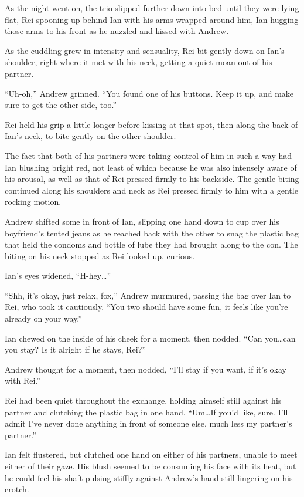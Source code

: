 As the night went on, the trio slipped further down into bed until they were lying flat, Rei spooning up behind Ian with his arms wrapped around him, Ian hugging those arms to his front as he nuzzled and kissed with Andrew.

As the cuddling grew in intensity and sensuality, Rei bit gently down on Ian's shoulder, right where it met with his neck, getting a quiet moan out of his partner.

``Uh-oh,'' Andrew grinned. ``You found one of his buttons. Keep it up, and make sure to get the other side, too.''

Rei held his grip a little longer before kissing at that spot, then along the back of Ian's neck, to bite gently on the other shoulder.

The fact that both of his partners were taking control of him in such a way had Ian blushing bright red, not least of which because he was also intensely aware of his arousal, as well as that of Rei pressed firmly to his backside. The gentle biting continued along his shoulders and neck as Rei pressed firmly to him with a gentle rocking motion.

Andrew shifted some in front of Ian, slipping one hand down to cup over his boyfriend's tented jeans as he reached back with the other to snag the plastic bag that held the condoms and bottle of lube they had brought along to the con. The biting on his neck stopped as Rei looked up, curious.

Ian's eyes widened, ``H-hey\ldots{}''

``Shh, it's okay, just relax, fox,'' Andrew murmured, passing the bag over Ian to Rei, who took it cautiously. ``You two should have some fun, it feels like you're already on your way.''

Ian chewed on the inside of his cheek for a moment, then nodded. ``Can you\ldots{}can you stay? Is it alright if he stays, Rei?''

Andrew thought for a moment, then nodded, ``I'll stay if you want, if it's okay with Rei.''

Rei had been quiet throughout the exchange, holding himself still against his partner and clutching the plastic bag in one hand. ``Um\ldots{}If you'd like, sure. I'll admit I've never done anything in front of someone else, much less my partner's partner.''

Ian felt flustered, but clutched one hand on either of his partners, unable to meet either of their gaze. His blush seemed to be consuming his face with its heat, but he could feel his shaft pulsing stiffly against Andrew's hand still lingering on his crotch.

